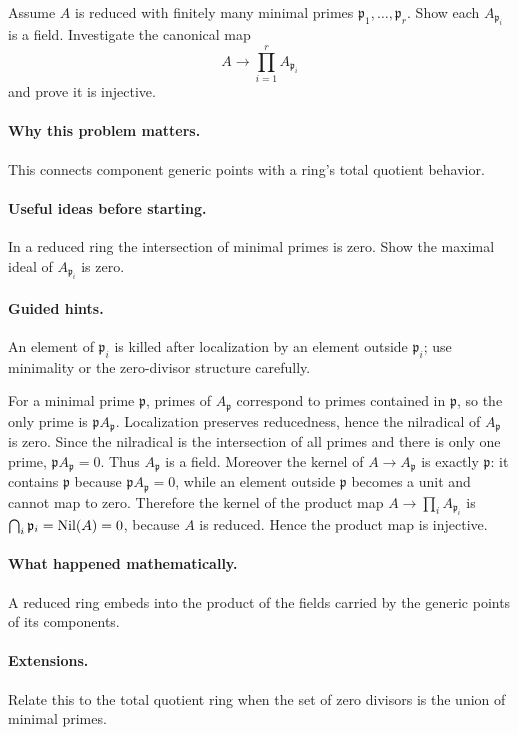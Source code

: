 \begin{problem}
Assume $A$ is reduced with finitely many minimal primes $\mathfrak p_1,\dots,\mathfrak p_r$.  Show each $A_{\mathfrak p_i}$ is a field.  Investigate the canonical map
\[
A\longrightarrow\prod_{i=1}^r A_{\mathfrak p_i}
\]
and prove it is injective.
\end{problem}

\paragraph{Why this problem matters.}
This connects component generic points with a ring's total quotient behavior.

\paragraph{Useful ideas before starting.}
In a reduced ring the intersection of minimal primes is zero.  Show the maximal ideal of $A_{\mathfrak p_i}$ is zero.

\paragraph{Guided hints.}
An element of $\mathfrak p_i$ is killed after localization by an element outside $\mathfrak p_i$; use minimality or the zero-divisor structure carefully.

\begin{solution}
For a minimal prime $\mathfrak p$, primes of $A_{\mathfrak p}$ correspond to primes contained in $\mathfrak p$, so the only prime is $\mathfrak pA_{\mathfrak p}$.  Localization preserves reducedness, hence the nilradical of $A_{\mathfrak p}$ is zero.  Since the nilradical is the intersection of all primes and there is only one prime, $\mathfrak pA_{\mathfrak p}=0$.  Thus $A_{\mathfrak p}$ is a field.  Moreover the kernel of $A\to A_{\mathfrak p}$ is exactly $\mathfrak p$: it contains $\mathfrak p$ because $\mathfrak pA_{\mathfrak p}=0$, while an element outside $\mathfrak p$ becomes a unit and cannot map to zero.  Therefore the kernel of the product map $A\to\prod_i A_{\mathfrak p_i}$ is $\bigcap_i\mathfrak p_i=\operatorname{Nil}(A)=0$, because $A$ is reduced.  Hence the product map is injective.
\end{solution}

\paragraph{What happened mathematically.}
A reduced ring embeds into the product of the fields carried by the generic points of its components.

\paragraph{Extensions.}
Relate this to the total quotient ring when the set of zero divisors is the union of minimal primes.
